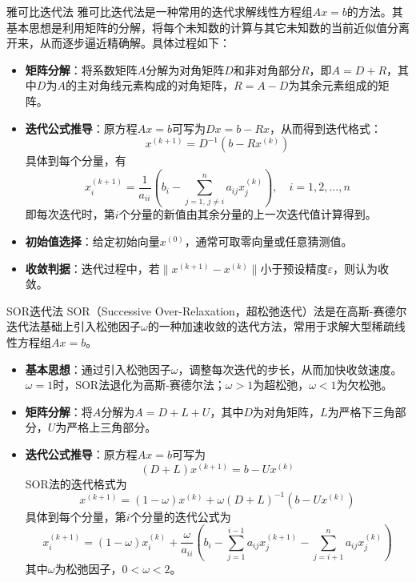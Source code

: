 \documentclass[UTF8,aspectratio=169]{beamer}
\begin{document}
\begin{frame}{雅可比迭代法}
    雅可比迭代法是一种常用的迭代求解线性方程组$Ax=b$的方法。其基本思想是利用矩阵的分解，将每个未知数的计算与其它未知数的当前近似值分离开来，从而逐步逼近精确解。具体过程如下：

    \begin{itemize}
        \item \textbf{矩阵分解}：将系数矩阵$A$分解为对角矩阵$D$和非对角部分$R$，即$A=D+R$，其中$D$为$A$的主对角线元素构成的对角矩阵，$R=A-D$为其余元素组成的矩阵。
        \item \textbf{迭代公式推导}：原方程$Ax=b$可写为$Dx = b - Rx$，从而得到迭代格式：
        \[
            x^{(k+1)} = D^{-1}(b - R x^{(k)})
        \]
        具体到每个分量，有
        \[
            x_i^{(k+1)} = \frac{1}{a_{ii}}\left(b_i - \sum_{j=1,\,j\neq i}^{n} a_{ij} x_j^{(k)}\right),\quad i=1,2,\ldots,n
        \]
        即每次迭代时，第$i$个分量的新值由其余分量的上一次迭代值计算得到。
        \item \textbf{初始值选择}：给定初始向量$x^{(0)}$，通常可取零向量或任意猜测值。
        \item \textbf{收敛判据}：迭代过程中，若$\|x^{(k+1)}-x^{(k)}\|$小于预设精度$\varepsilon$，则认为收敛。
    \end{itemize}
\end{frame}

\begin{frame}{SOR迭代法}
    SOR（Successive Over-Relaxation，超松弛迭代）法是在高斯-赛德尔迭代法基础上引入松弛因子$\omega$的一种加速收敛的迭代方法，常用于求解大型稀疏线性方程组$Ax=b$。

    \begin{itemize}
        \item \textbf{基本思想}：通过引入松弛因子$\omega$，调整每次迭代的步长，从而加快收敛速度。$\omega=1$时，SOR法退化为高斯-赛德尔法；$\omega>1$为超松弛，$\omega<1$为欠松弛。
        \item \textbf{矩阵分解}：将$A$分解为$A=D+L+U$，其中$D$为对角矩阵，$L$为严格下三角部分，$U$为严格上三角部分。
        \item \textbf{迭代公式推导}：原方程$Ax=b$可写为
        \[
            (D+L)x^{(k+1)} = b - Ux^{(k)}
        \]
        SOR法的迭代格式为
        \[
            x^{(k+1)} = (1-\omega)x^{(k)} + \omega(D+L)^{-1}(b - Ux^{(k)})
        \]
        具体到每个分量，第$i$个分量的迭代公式为
        \[
            x_i^{(k+1)} = (1-\omega)x_i^{(k)} + \frac{\omega}{a_{ii}}\left(b_i - \sum_{j=1}^{i-1} a_{ij}x_j^{(k+1)} - \sum_{j=i+1}^{n} a_{ij}x_j^{(k)}\right)
        \]
        其中$\omega$为松弛因子，$0<\omega<2$。
    \end{itemize}
\end{frame}
\end{document}
